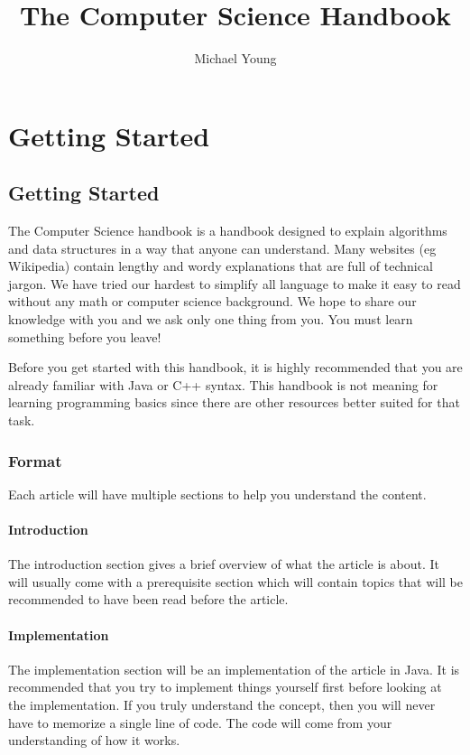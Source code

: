 \documentclass[11pt,oneside]{book}
\title{The Computer Science Handbook}
\author{Michael Young}
\begin{document}
		\maketitle
		\tableofcontents
		\chapter{ Getting Started }
    \section{ Getting Started }
    

The Computer Science handbook is a handbook designed to explain algorithms and data structures in a way that anyone can understand. Many websites (eg Wikipedia) contain lengthy and wordy explanations that are full of technical jargon. We have tried our hardest to simplify all language to make it easy to read without any math or computer science background. We hope to share our knowledge with you and we ask only one thing from you. You must learn something before you leave!

Before you get started with this handbook, it is highly recommended that you are already familiar with Java or C++ syntax. This handbook is not meaning for learning programming basics since there are other resources better suited for that task.

\subsection{Format}

Each article will have multiple sections to help you understand the content.

\subsubsection{Introduction}

The introduction section gives a brief overview of what the article is about. It will usually come with a prerequisite section which will contain topics that will be recommended to have been read before the article.

\subsubsection{Implementation}

The implementation section will be an implementation of the article in Java. It is recommended that you try to implement things yourself first before looking at the implementation. If you truly understand the concept, then you will never have to memorize a single line of code. The code will come from your understanding of how it works.
\end{document}

